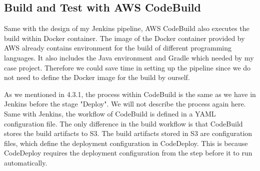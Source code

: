\subsection{Build and Test with AWS CodeBuild}
Same with the design of my Jenkins pipeline, AWS CodeBuild also executes the build within Docker container. The image of the Docker container provided by AWS already contains environment for the build of different programming languages. It also includes the Java environment and Gradle which needed by my case project. Therefore we could save time in setting up the pipeline since we do not need to define the Docker image for the build by ourself.
\par
As we mentioned in 4.3.1, the process within CodeBuild is the same as we have in Jenkins before the stage "Deploy". We will not describe the process again here. Same with Jenkins, the workflow of CodeBuild is defined in a YAML configuration file. The only difference in the build workflow is that CodeBuild stores the build artifacts to S3. The build artifacts stored in S3 are configuration files, which define the deployment configuration in CodeDeploy. This is because CodeDeploy requires the deployment configuration from the step before it to run automatically.
